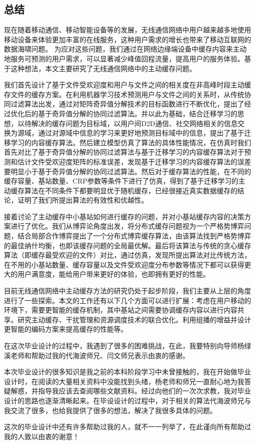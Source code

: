 \documentclass[bachelor]{seuthesis} %
\begin{document}
\begin{Main}
\chapter{总结}
现在随着移动通信、移动智能设备等的发展，无线通信网络中用户越来越多地使用移动设备来体验更加丰富的在线服务，这种用户需求的增长也带来了移动互联网的数据海啸问题。
为应对这些问题，我们通过在网络边缘端设备中缓存内容来主动地服务可预测的用户需求，可以显著减少峰值回程流量，提高用户的服务体验。基于这种想法，本文主要研究了无线通信网络中的主动缓存问题。\par
我们首先设计了基于文件受欢迎度和用户与文件之间的相关度在非高峰时段主动缓存文件的缓存方案。在利用机器学习技术预测用户与文件之间的关系时，从传统协同过滤算法出发，通过对矩阵奇异值分解技术的目标函数进行不断优化，提出了经过优化后的基于奇异值分解的协同过滤算法。并以此为基础，结合迁移学习的思想，以待解决的缓存问题为目标域，以用户间D2D通信、社交网络相关的信息交换为源域，通过对源域中信息的学习来更好地预测目标域中的信息，提出了基于迁移学习的内容缓存算法。然后建立模型仿真了算法的具体性能情况，在仿真时我们首先对比了基于奇异值分解的协同过滤算法与基于迁移学习的内容缓存算法对于预测和估计文件受欢迎度矩阵的标准误差，发现基于迁移学习的内容缓存算法的误差要明显小于基于奇异值分解的协同过滤算法。然后对于缓存算法的性能，在不同的缓存容量、基站数量、CRP参数等条件下进行了仿真，得到了基于迁移学习的主动缓存算法在不同条件下都要明显优于随机缓存，已经很接近真实数据缓存的结论，证明了我们所提出算法的有效性和优越性。\par
接着讨论了主动缓存中小基站如何进行缓存的问题，并对小基站缓存内容的决策方案进行了优化。我们从博弈论角度出发，将分布式缓存问题视为一个严格势博弈问题，结合局部合作博弈提出了一个分布式博弈缓存算法，由该算法找到严格势博弈的最佳纳什均衡，也即该缓存问题的全局最优解。最后将该算法与传统的贪心缓存算法（即缓存最受欢迎的文件）对比，通过仿真，发现所提出算法对比传统方法，在不用的小基站数量、缓存容量以及文件受欢迎度分布参数等情况下都可以获得更大的用户满意度，能给用户带来更好的体验，也即拥有更好的性能。\par
目前无线通信网络中主动缓存方法的研究仍处于起步阶段，我们主要从上层的角度进行了一些探索。本文的工作还有以下几个方面可以进行扩展：考虑在用户移动的环境下，需要更智能的缓存机制，其中基站之间需要协调缓存内容以进行内容共享。研究主动缓存、干扰管理和资源调度技术的联合优化。利用组播的增益并设计更智能的编码方案来提高缓存的性能等。
\end{Main} %

\begin{Acknowledgement}
在这次毕业设计的过程中，我遇到了很多的困难挑战，在此，我要特别向导师杨绿溪老师和帮助过我的代海波师兄、闫文师兄表示由衷的感谢。\par
本次毕业设计的很多知识是我之前的本科阶段学习中未曾接触的，我在开始做毕业设计时，在阅读的大量相关资料中没能找到头绪，杨老师和师兄一直耐心地为我答疑解惑，并指导我应该去查阅哪些文献资料。经过向他们的一次次求教，我对毕业设计的思路也逐渐清晰起来。在毕设设计的过程中，对于相关的算法代海波师兄与我交流了很多，也给我提供了很多的想法，解决了我很多具体的问题。\par
这次的毕业设计中还有许多帮助过我的人，就不一一列举了，在此谨向所有帮助过我的人致以由衷的谢意！
\end{Acknowledgement}
\end{document}
